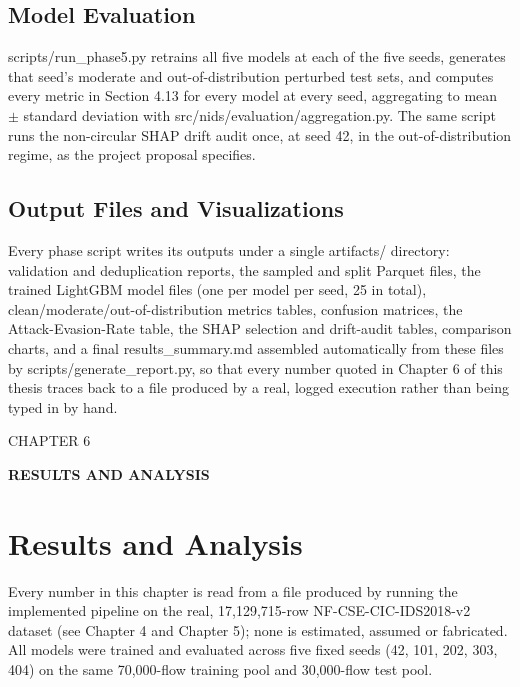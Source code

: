 \documentclass[12pt,a4paper]{report}
\begin{document}
\section{Model Evaluation}
scripts/run\_phase5.py retrains all five models at each of the five seeds, generates that seed's moderate and out-of-distribution perturbed test sets, and computes every metric in Section 4.13 for every model at every seed, aggregating to mean $\pm$ standard deviation with src/nids/evaluation/aggregation.py. The same script runs the non-circular SHAP drift audit once, at seed 42, in the out-of-distribution regime, as the project proposal specifies.

\section{Output Files and Visualizations}
Every phase script writes its outputs under a single artifacts/ directory: validation and deduplication reports, the sampled and split Parquet files, the trained LightGBM model files (one per model per seed, 25 in total), clean/moderate/out-of-distribution metrics tables, confusion matrices, the Attack-Evasion-Rate table, the SHAP selection and drift-audit tables, comparison charts, and a final results\_summary.md assembled automatically from these files by scripts/generate\_report.py, so that every number quoted in Chapter 6 of this thesis traces back to a file produced by a real, logged execution rather than being typed in by hand.

\begin{center}CHAPTER 6\end{center}
\begin{center}\textbf{RESULTS AND ANALYSIS}\end{center}\vspace{4pt}
\chapter{Results and Analysis}
Every number in this chapter is read from a file produced by running the implemented pipeline on the real, 17,129,715-row NF-CSE-CIC-IDS2018-v2 dataset (see Chapter 4 and Chapter 5); none is estimated, assumed or fabricated. All models were trained and evaluated across five fixed seeds (42, 101, 202, 303, 404) on the same 70,000-flow training pool and 30,000-flow test pool.
\end{document}

